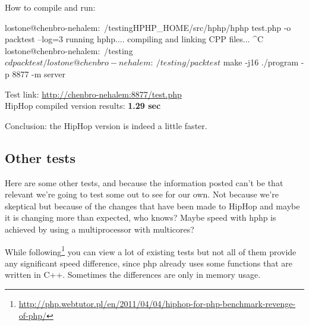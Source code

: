 How to compile and run:
\begin{codelisting}
lostone@chenbro-nehalem:~/testing$ $HPHP_HOME/src/hphp/hphp test.php -o packtest --log=3
running hphp....
compiling and linking CPP files...
^C
lostone@chenbro-nehalem:~/testing$ cd packtest/
lostone@chenbro-nehalem:~/testing/packtest$ make -j16
./program -p 8877 -m server
\end{codelisting}

Test link: \url{http://chenbro-nehalem:8877/test.php}\\
HipHop compiled version results: \textbf{1.29 sec}

Conclusion: the HipHop version is indeed a little faster.

\subsection{Other tests}
Here are some other tests, and because the information posted can't be that relevant we're going to test some out to see for our own. 
Not because we're skeptical but because of the changes that have been made to HipHop and maybe it is changing more than expected, who knows? 
Maybe speed with \gls{hphp} is achieved by using a multiprocessor with multicores?

While following\footnote{\url{http://php.webtutor.pl/en/2011/04/04/hiphop-for-php-benchmark-revenge-of-php/}} you can view a lot of existing tests but not all of them provide any significant speed difference, since \gls{php} already uses some functions that are written in C++. Sometimes the differences are only in memory usage.

